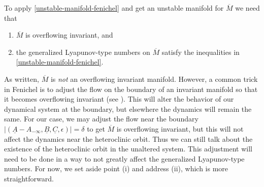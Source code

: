 To apply \cref{unstable-manifold-fenichel} and get an unstable manifold for \(\overline M\) we need that 
\begin{enumerate}[label=(\roman*)]
	\item \(\overline M\) is overflowing invariant, and 
	\item the generalized Lyapunov-type numbers on \(\overline M\) satisfy the inequalities in \cref{unstable-manifold-fenichel}.
\end{enumerate}
As written, \(\overline M\) is \emph{not} an overflowing invariant manifold. However, a common trick in Fenichel is to adjust the flow on the boundary of an invariant manifold so that it becomes overflowing invariant (see \cite[\S 6.3]{wiggins1994normally}). This will alter the behavior of our dynamical system at the boundary, but elsewhere the dynamics will remain the same. For our case, we may adjust the flow near the boundary \(|(\underline A - A_{-\infty}, \underline B, \underline C,  \epsilon)| = \delta\) to get \(\overline M\) is overflowing invariant, but this will not affect the dynamics near the heteroclinic orbit. Thus we can still talk about the existence of the heteroclinic orbit in the unaltered system. This adjustment will need to be done in a way to not greatly affect the generalized Lyapunov-type numbers. For now, we set aside point (i) and address (ii), which is more straightforward. 

